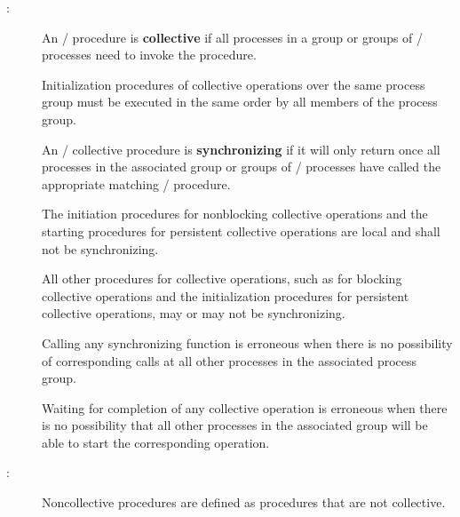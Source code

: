 \begin{description}
\item[:]
An \MPI/ procedure is \textbf{collective} if all processes in a group or groups of \MPI/ processes need to invoke the procedure.

Initialization procedures of collective operations over the same
process group must be executed in the same order by all members of the
process group.

An \MPI/ collective procedure is \textbf{synchronizing} if it will
only return once all processes in the associated group or groups of \MPI/ processes have called the
appropriate matching \MPI/ procedure.

The initiation procedures for nonblocking collective operations and
the starting procedures for persistent collective operations are local
and shall not be synchronizing.

All other procedures for collective operations,
such as for blocking collective operations and the
initialization procedures for persistent collective operations, may or
may not be synchronizing.

\begin{users}
Calling any synchronizing function is erroneous when there is no possibility of
corresponding calls at all other processes in the associated process
group.

Waiting for completion of any collective operation is erroneous when there is no possibility
that all other processes in the associated group will be able to start
the corresponding operation.
\end{users}

\item[:]
Noncollective procedures are defined as procedures that are not collective.
\end{description}

